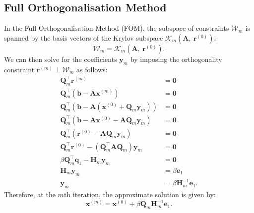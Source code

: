 \documentclass{article}
\begin{document}
\subsection{Full Orthogonalisation Method}
In the Full Orthogonalisation Method (FOM), the subspace of constraints
\(\mathcal{W}_m\) is spanned by the basis vectors of the Krylov
subspace \(\mathcal{K}_m\left( \symbf{A},\: \symbf{r}^{\left( 0
\right)} \right)\):
\begin{equation*}
    \mathcal{W}_m = \mathcal{K}_m\left( \symbf{A},\: \symbf{r}^{\left( 0 \right)} \right).
\end{equation*}
We can then solve for the coefficients \(\symbf{y}_m\) by imposing the
orthogonality constraint \(\symbf{r}^{\left( m \right)} \perp \mathcal{W}_m\)
as follows:
\begin{align*}
    \symbf{Q}_m^\top \symbf{r}^{\left( m \right)}                                                                               & = \symbf{0}                           \\
    \symbf{Q}_m^\top \left( \symbf{b} - \symbf{A} \symbf{x}^{\left( m \right)} \right)                                          & = \symbf{0}                           \\
    \symbf{Q}_m^\top \left( \symbf{b} - \symbf{A} \left( \symbf{x}^{\left( 0 \right)} + \symbf{Q}_m \symbf{y}_m \right) \right) & = \symbf{0}                           \\
    \symbf{Q}_m^\top \left( \symbf{b} - \symbf{A} \symbf{x}^{\left( 0 \right)} - \symbf{A} \symbf{Q}_m \symbf{y}_m \right)      & = \symbf{0}                           \\
    \symbf{Q}_m^\top \left( \symbf{r}^{\left( 0 \right)} - \symbf{A} \symbf{Q}_m \symbf{y}_m \right)                            & = \symbf{0}                           \\
    \symbf{Q}_m^\top \symbf{r}^{\left( 0 \right)} - \left( \symbf{Q}_m^\top \symbf{A} \symbf{Q}_m \right) \symbf{y}_m           & = \symbf{0}                           \\
    \beta \symbf{Q}_m^\top \symbf{q}_1 - \symbf{H}_m \symbf{y}_m                                                                & = \symbf{0}                           \\
    \symbf{H}_m \symbf{y}_m                                                                                                     & = \beta \symbf{e}_1                   \\
    \symbf{y}_m                                                                                                                 & = \beta \symbf{H}_m^{-1} \symbf{e}_1.
\end{align*}
Therefore, at the \(m\)th iteration, the approximate solution is given by:
\begin{equation*}
    \symbf{x}^{\left( m \right)} = \symbf{x}^{\left( 0 \right)} + \beta \symbf{Q}_m \symbf{H}_m^{-1} \symbf{e}_1.
\end{equation*}
\end{document}
